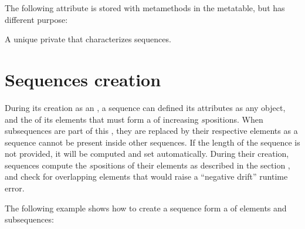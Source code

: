 \documentclass[letterpaper,10pt,english]{sphinxmanual}
\begin{document}
\sphinxAtStartPar
The following attribute is stored with metamethods in the metatable, but has different purpose:

\sphinxAtStartPar
{} A unique private  that characterizes sequences.


\section{Sequences creation}
\label{\detokenize{sequences:sequences-creation}}
\sphinxAtStartPar
During its creation as an , a sequence can defined its attributes as any object, and the  of its elements that must form a
 of increasing \(s\)\sphinxhyphen{}positions. When subsequences are part of this , they are replaced by their respective elements as a
sequence  cannot be present inside other sequences. If the length of the sequence is not provided, it will be computed and set automatically.
During their creation, sequences compute the \(s\)\sphinxhyphen{}positions of their elements as described in the section {\hyperref[\detokenize{sequences:element-positions}]{}}, and check for overlapping
elements that would raise a “negative drift” runtime error.

\sphinxAtStartPar
The following example shows how to create a sequence form a  of elements and subsequences:
\end{document}
